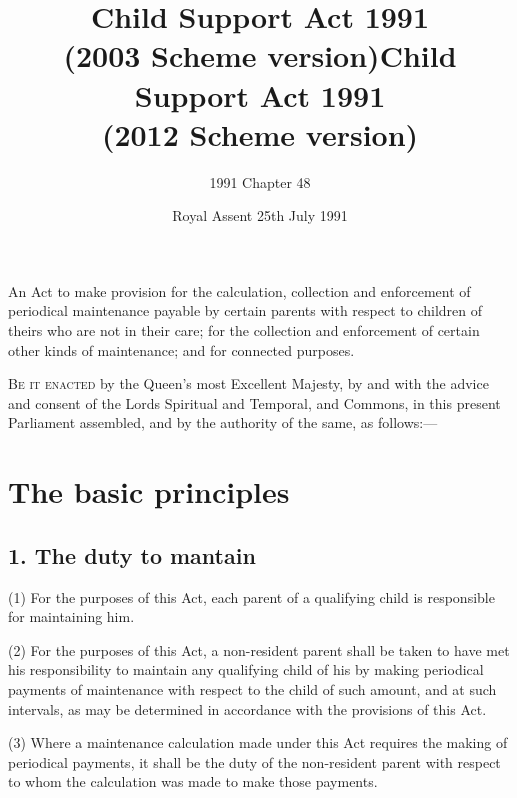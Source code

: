 \documentclass[a4paper]{article}
\title{\regstitle}
\title{Child Support Act 1991\\ (2003 Scheme version)}
\title{Child Support Act 1991\\ (2012 Scheme version)}
\author{1991 Chapter 48}
\date{Royal Assent 25th July 1991}
\begin{document}
\maketitle

\noindent
{\large An Act to make provision for the calculation, collection and enforcement of periodical maintenance payable by certain parents with respect to children of theirs who are not in their care; for the collection and enforcement of certain other kinds of maintenance; and for connected purposes.}


\bigskip

\lettrine{B}{e it enacted} by the Queen’s most Excellent Majesty, by and with the advice and consent of the Lords Spiritual and Temporal, and Commons, in this present Parliament assembled, and by the authority of the same, as follows:—


{\sloppy

\tableofcontents

}

\setcounter{secnumdepth}{-2}

\section{The basic principles}

\subsection{1. The duty to mantain}

(1) For the purposes of this Act, each parent of a qualifying child is
responsible for maintaining him.

(2) For the purposes of this Act, a non-resident parent shall be
taken to have met his responsibility to maintain any qualifying child of his by making
periodical payments of maintenance with respect to the child of such amount, and at
such intervals, as may be determined in accordance with the provisions of this Act.

(3) Where a maintenance calculation made under this
Act requires the making of periodical payments, it shall be the duty of the non-resident parent with respect to whom the calculation was
made to make those payments.
\end{document}
